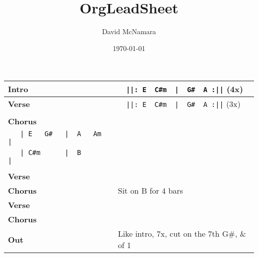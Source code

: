 \documentclass{LeadMemo}
\title{OrgLeadSheet}
\author{David McNamara}
\date{\today}
\begin{document}
\maketitle

\def\arraystretch{2.5}
\begin{tabular}[h]{ p{}  p{}  }
    \huge\textbf{Intro\vfill}         &\large\verb!  ||: E  C#m  |  G#  A :||! (4x)\\
    \hline
    \huge\textbf{Verse\vfill}         &\large\verb!  ||: E  C#m  |  G#  A :||! (3x)\\
    \\  
    \huge\textbf{Chorus\vfill}         & \begin{minipage}[t]{\textwidth}
    \large\verb!  ||: E  C#m  |  G#  A   :||! (3x)\\
    \large\verb!   | E   G#   |  A   Am   |!\\
    \large\verb!   | C#m      |  B        |! \\
    \end{minipage}\\
    \hline
    \huge\textbf{Verse\vfill} & \\
   \huge\textbf{Chorus\vfill} &  \large{Sit on B for 4 bars} \\
    \huge\textbf{Verse\vfill} & \\
   \huge\textbf{Chorus\vfill} & \\
      \huge\textbf{Out\vfill} & \large{Like intro, 7x, cut on the 7th G\#}, \& of 1  \\
  \end{tabular}
\def\arraystretch{1.0}
\end{document}

